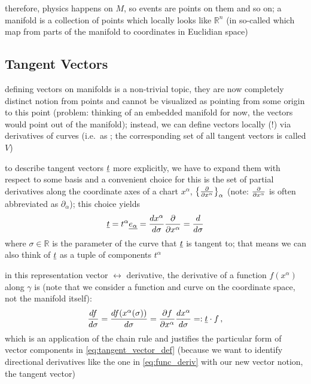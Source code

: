 \documentclass[../relativity_main.tex]{subfiles}
\begin{document}
therefore, physics happens on  $M$, so events are points on them and so on; a manifold is a collection of points which locally looks like $\mathbb{R}^n$ (in so-called  which map from parts of the manifold to coordinates in Euclidian space)




		\subsection{Tangent Vectors}
defining vectors on manifolds is a non-trivial topic, they are now completely distinct notion from points and cannot be visualized as pointing from some origin to this point (problem: thinking of an embedded manifold for now, the vectors would point out of the manifold); instead, we can define vectors locally (!) via derivatives of curves (i.e.~as ; the corresponding set of all tangent vectors is called  $V$)

to describe tangent vectors $\underline{t}$ more explicitly, we have to expand them with respect to some basis and a convenient choice for this is the set of partial derivatives along the coordinate axes of a chart $x^\alpha$, $\qty{\pdv{x^\alpha}}_\alpha$ (note: $\pdv{x^\alpha}$ is often abbreviated as $\partial_\alpha$); this choice yields
\begin{equation}\label{eq:tangent_vector_def}
\underline{t} = t^\alpha \underline{e_\alpha} = \dv{x^\alpha}{\sigma} \pdv{x^\alpha} = \dv{\sigma}
\end{equation}
where $\sigma \in \mathbb{R}$ is the parameter of the curve that $\underline{t}$ is tangent to; that means we can also think of $\underline{t}$ as a tuple of components $t^\alpha$

in this representation vector $\leftrightarrow$ derivative, the derivative of a function $f(x^\alpha)$ along $\gamma$ is (note that we consider a function and curve on the coordinate space, not the manifold itself):
\begin{equation}\label{eq:func_deriv}
\dv{f}{\sigma} = \dv{f(x^\alpha(\sigma))}{\sigma} = \pdv{f}{x^\alpha} \dv{x^\alpha}{\sigma} =: \underline{t} \cdot f \, ,
\end{equation}
which is an application of the chain rule and justifies the particular form of vector components in \eqref{eq:tangent_vector_def} (because we want to identify directional derivatives like the one in \eqref{eq:func_deriv} with our new vector notion, the tangent vector)
\end{document}
